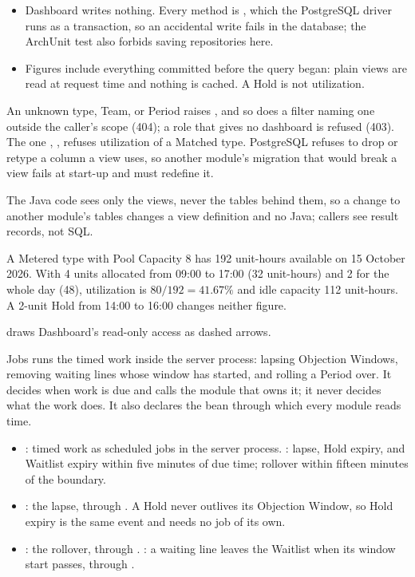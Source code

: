 \begin{itemize}
\item Dashboard writes nothing. Every method is , which the PostgreSQL driver runs as a  transaction, so an accidental write fails in the database; the ArchUnit test also forbids saving repositories here.
\item Figures include everything committed before the query began: plain views are read at request time and nothing is cached. A Hold is not utilization.
\end{itemize}

An unknown type, Team, or Period raises , and so does a filter naming one outside the caller's scope (404); a role that gives no dashboard is refused (403). The one , , refuses utilization of a Matched type. PostgreSQL refuses to drop or retype a column a view uses, so another module's migration that would break a view fails at start-up and must redefine it.

The Java code sees only the views, never the tables behind them, so a change to another module's tables changes a view definition and no Java; callers see result records, not SQL.

A Metered type with Pool Capacity 8 has 192 unit-hours available on 15 October 2026. With 4 units allocated from 09:00 to 17:00 (32 unit-hours) and 2 for the whole day (48), utilization is $80 / 192 = 41.67\%$ and idle capacity 112 unit-hours. A 2-unit Hold from 14:00 to 16:00 changes neither figure.

 draws Dashboard's read-only access as dashed arrows.


Jobs runs the timed work inside the server process: lapsing Objection Windows, removing waiting lines whose window has started, and rolling a Period over. It decides when work is due and calls the module that owns it; it never decides what the work does. It also declares the  bean through which every module reads time.

\begin{itemize}
\item {}: timed work as scheduled jobs in the server process. : lapse, Hold expiry, and Waitlist expiry within five minutes of due time; rollover within fifteen minutes of the boundary.
\item {}: the lapse, through . A Hold never outlives its Objection Window, so Hold expiry is the same event and needs no job of its own.
\item {}: the rollover, through . : a waiting line leaves the Waitlist when its window start passes, through .
\end{itemize}

